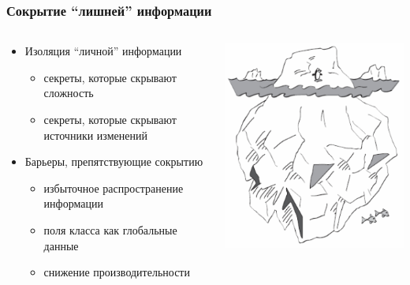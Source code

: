 \documentclass[xetex,mathserif,serif]{beamer}
\begin{document}
	\begin{frame}
		\frametitle{Сокрытие ``лишней'' информации}
		\begin{columns}
			\begin{column}{0.65\textwidth}
				\begin{itemize}
					\item Изоляция ``личной'' информации
					\begin{itemize}
						\item секреты, которые скрывают сложность
						\item секреты, которые скрывают источники изменений
					\end{itemize}
					\item Барьеры, препятствующие сокрытию
					\begin{itemize}
						\item избыточное распространение информации
						\item поля класса как глобальные данные
						\item снижение производительности
					\end{itemize}
				\end{itemize}
			\end{column}
			\begin{column}{0.3\textwidth}
				\vskip 3cm
				\begin{flushright}
					\includegraphics[width=\textwidth]{complexityHiding.png}
				\end{flushright}
			\end{column}
		\end{columns}
	\end{frame}
\end{document}
